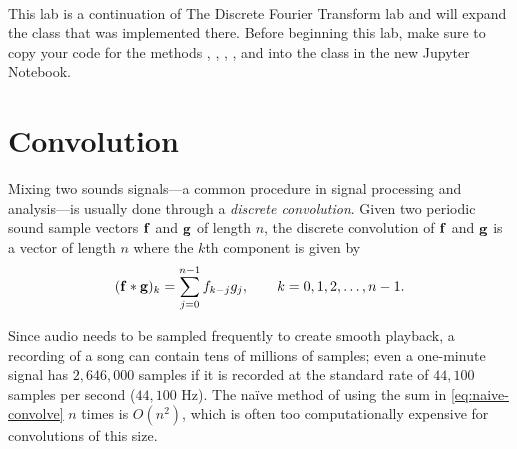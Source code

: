 \\
\begin{warn}
This lab is a continuation of The Discrete Fourier Transform lab and will expand the  class that was implemented there. 
Before beginning this lab, make sure to copy your code for the methods , , , , and  into the  class in the new Jupyter Notebook.
\end{warn}

\section*{Convolution} %

Mixing two sounds signals---a common procedure in signal processing and analysis---is usually done through a \emph{discrete convolution}.
Given two periodic sound sample vectors $\mathbf{f}$ and $\mathbf{g}$ of length $n$, the discrete convolution of $\mathbf{f}$ and $\mathbf{g}$ is a vector of length $n$ where the $k$th component is given by
\begin{align}
(\mathbf{f} \ast \mathbf{g})_k = \sum_{j=0}^{n-1} f_{k-j}g_j,\qquad k = 0,1,2,\dots,n-1.
\label{eq:naive-convolve}
\end{align}

Since audio needs to be sampled frequently to create smooth playback, a recording of a song can contain tens of millions of samples; even a one-minute signal has $2,646,000$ samples if it is recorded at the standard rate of $44,100$ samples per second ($44,100$ Hz).
The na\"ive method of using the sum in \eqref{eq:naive-convolve} $n$ times is $O(n^2)$, which is often too computationally expensive for convolutions of this size.

